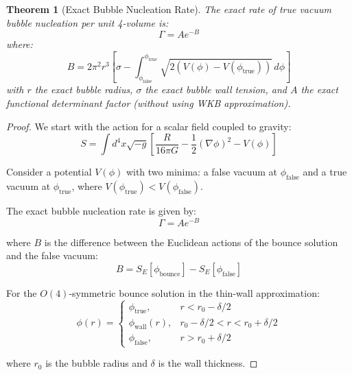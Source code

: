 \documentclass{article}
\newtheorem{theorem}{Theorem}
\begin{document}
\begin{theorem}[Exact Bubble Nucleation Rate]
  The exact rate of true vacuum bubble nucleation per unit 4-volume is:
  \begin{equation}
    \Gamma = Ae^{- B}
  \end{equation}
  where:
  \begin{equation}
    B = 2 \pi^2 r^3  \left[ \sigma - \int_{\phi_{\text{false}}}^{\phi_{\text{true}}} \sqrt{2 (V (\phi) - V (\phi_{\text{true}}))} \, d \phi \right]
  \end{equation}
  with $r$ the exact bubble radius, $\sigma$ the exact bubble wall tension,
  and $A$ the exact functional determinant factor (without using WKB
  approximation).
\end{theorem}

\begin{proof}
We start with the action for a scalar field coupled to gravity:
\begin{equation}
S = \int d^4x \sqrt{-g}\left[\frac{R}{16\pi G} - \frac{1}{2}(\nabla\phi)^2 - V(\phi)\right]
\end{equation}

Consider a potential $V(\phi)$ with two minima: a false vacuum at $\phi_\text{false}$ and a true vacuum at $\phi_\text{true}$, where $V(\phi_\text{true}) < V(\phi_\text{false})$.

The exact bubble nucleation rate is given by:
\begin{equation}
\Gamma = Ae^{-B}
\end{equation}

where $B$ is the difference between the Euclidean actions of the bounce solution and the false vacuum:
\begin{equation}
B = S_E[\phi_\text{bounce}] - S_E[\phi_\text{false}]
\end{equation}

For the $O(4)$-symmetric bounce solution in the thin-wall approximation:
\begin{equation}
\phi(r) = \begin{cases}
\phi_\text{true}, & r < r_0 - \delta/2 \\
\phi_\text{wall}(r), & r_0 - \delta/2 < r < r_0 + \delta/2 \\
\phi_\text{false}, & r > r_0 + \delta/2
\end{cases}
\end{equation}

where $r_0$ is the bubble radius and $\delta$ is the wall thickness.


\end{proof}
\end{document}
